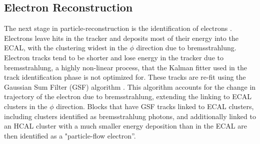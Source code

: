 \subsection{Electron Reconstruction}
\label{electron_reco_overview}

\par The next stage in particle-reconstruction is the identification
of electrons \cite{CMS-PAS-PFT-09-001}.  Electrons leave hits in the
tracker and deposits most of their energy into the ECAL, with the
clustering widest in the $\phi$ direction due to bremsstrahlung.
Electron tracks tend to be shorter and lose energy in the tracker due
to bremsstrahlung, a highly non-linear process, that the Kalman
fitter used in the track identification phase is not optimized for.
These tracks are re-fit using the Gaussian Sum Filter (GSF) algorithm
\cite{Adam:2005bya}. This algorithm accounts for the change in
trajectory of the electron due to bremsstrahlung, extending the
linking to ECAL clusters in the $\phi$ direction.  Blocks that have
GSF tracks linked to ECAL clusters, including clusters identified as
bremsstrahlung photons, and additionally linked to an HCAL cluster with
a much smaller energy deposition than in the ECAL are then identified
as a "particle-flow electron''.  

